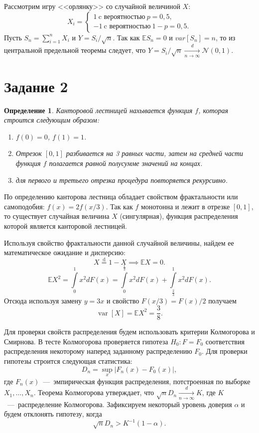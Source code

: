\documentclass[12pt, a4paper]{article} %
\newcommand\Eqtext[1]{\mathrel{\stackrel{\mathrm{\text{#1}}}=}}
\def\Expec{\mathbb{E}} %
\def\Norm{\mathcal{N}} %
\DeclareMathOperator{\var}{var}
\newtheorem{Def}{Определение}
\begin{document}
Рассмотрим игру <<орлянку>> со случайной величиной $X$:
\[
    X_i =
    \begin{cases}
        1\ \text{c вероятностью}\ p = 0{,}5, \\
        -1\ \text{c вероятностью}\ 1 - p = 0{,}5.
    \end{cases} 
\] 
Пусть  $S_n = \sum\limits_{i=1}^{n} X_i$ и $Y = S_i /\!\sqrt{n}$.
Так как $\Expec S_n = 0$ и  $var[S_n] = n$, то из центральной предельной теоремы следует,
что $Y = S_i /\!\sqrt{n} \xrightarrow[n \rightarrow \infty]{d}  \Norm(0, 1)$.

\section*{Задание 2}

\begin{Def}
    Канторовой лестницей нахывается функция $f$, которая строится следующим образом:
    \begin{enumerate}
        \item $f(0) = 0$,  $f(1) = 1$.
        \item Отрезок  $[0, 1]$ разбивается на 3 равных части, затем на 
            средней части функция  $f$ полагается равной полусумме значений на концах.
        \item для первого и третьего отрезка процедура повторяется рекурсивно.
    \end{enumerate} 
\end{Def} 

По определению канторова лестница обладает свойством фрактальности или самоподобия:
$f(x) = 2f(x / 3)$.
Так как  $f$ монотонна и лежит в отрезке  $[0, 1]$, то существует 
случайная величина $X$ (сингулярная), функция распределения которой является канторовой лестницей.

Используя свойство фрактальности данной случайной величины, найдем ее математическое ожидание и дисперсию:
\[
    X \Eqtext{d} 1 - X \implies \Expec X = 0.
\] 
\begin{equation*}
    \Expec X^2 = \int\limits_{0}^{1} x^2 dF(x) = 
    \int\limits_{0}^{\frac{1}{3}} x^2 dF(x) +
    \int\limits_{\frac{2}{3}}^{1}  x^2 dF(x).    
\end{equation*}
Отсюда используя замену $y = 3x$ и свойство $F(x / 3) = F(x) / 2$ получаем 
 \[
     \var\left[ X \right] = \Expec X^2 = \frac{3}{8}.
\] 

Для проверки свойств распределения будем использовать критерии Колмогорова и Смирнова.
В тесте Колмогорова проверяется гипотеза $H_0\colon F = F_0$ соответствия распределения некоторому наперед заданному распределению  $F_0$.
Для проверки гипотезы строится следующая статистика:
 \[
     D_n = \sup\limits_x \bigl\lvert F_n(x) - F_0(x) \bigr\rvert, 
\]
где $F_n(x)$~---~эмпирическая функция распределения, потстроенная по выборке  $X_1, \ldots, X_n$.
Теорема Колмогорова утверждает, что $\sqrt{n}D_n \xrightarrow[n \rightarrow \infty]{d} K$, 
где  $K$~---~распределение Колмогорова.
Зафиксируем некоторый уровень доверия  $\alpha$ и будем отклонять гипотезу, когда
\[
    \sqrt{n} D_n > K^{-1}(1 - \alpha).
\] 
\end{document}
